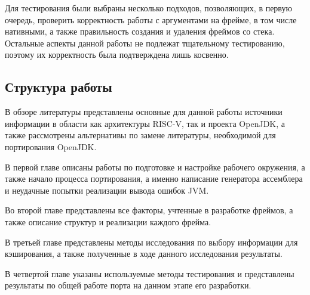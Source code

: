 Для тестирования были выбраны несколько подходов, позволяющих, в первую очередь, проверить корректность работы с аргументами на фрейме, в том числе нативными, а также правильность создания и удаления фреймов со стека. Остальные аспекты данной работы не подлежат тщательному тестированию, поэтому их корректность была подтверждена лишь косвенно.

\subsection*{Структура работы}

В обзоре литературы представлены основные для данной работы источники информации в области как архитектуры RISC-V, так и проекта OpenJDK, а также рассмотрены альтернативы по замене литературы, необходимой для портирования OpenJDK.

В первой главе описаны работы по подготовке и настройке рабочего окружения, а также начало процесса портирования, а именно написание генератора ассемблера и неудачные попытки реализации вывода ошибок JVM.

Во второй главе представлены все факторы, учтенные в разработке фреймов, а также описание структур и реализации каждого фрейма.

В третьей главе представлены методы исследования по выбору информации для кэширования, а также полученные в ходе данного исследования результаты. 

В четвертой главе указаны используемые методы тестирования и представлены результаты по общей работе порта на данном этапе его разработки.

\renewcommand{\thefigure}{\arabic{section}.\arabic{figure}}